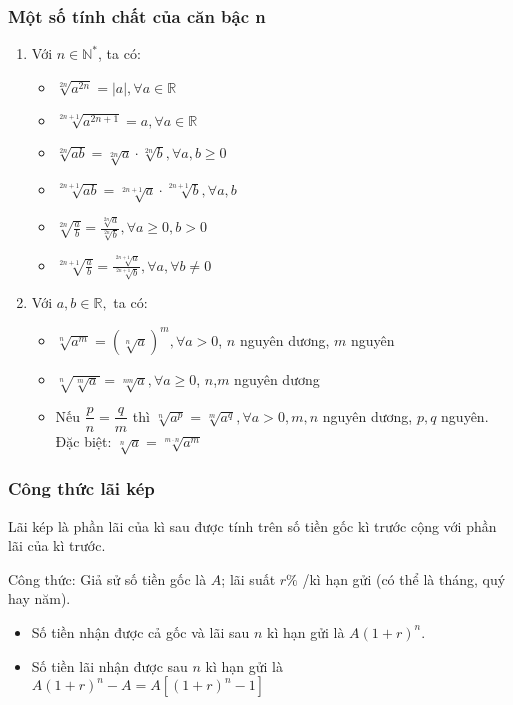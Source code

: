 \subsubsection{Một số tính chất của căn bậc n}
\begin{enumerate}
	\item Với $n\in {\mathbb{N}}^{*}$, ta có: 
	\begin{multicols}{2}
		\begin{itemize}
		\item $\sqrt[2n]{a^{2n}}=|a|,\forall a \in  \mathbb{R}$
		\item $\sqrt[2n+1]{a^{2n+1}}=a,\forall a \in \mathbb{R} $
		\item $\sqrt[2n]{ab}=\sqrt[2n]{a}\cdot \sqrt[2n]{b},\forall {a,b}\ge 0$
		\item $\sqrt[2n+1]{ab}=\sqrt[2n+1]{a}\cdot \sqrt[{2n}+1]{b},\forall a,b$ 
		\item  $\sqrt[{2n}]{\frac{a}{b}}=\frac{\sqrt[{2n}]{a}}{\sqrt[{2n}]{b}},\forall a\ge 0, b>0$
		\item $\sqrt[{2n}+1]{\frac{a}{b}}=\frac{\sqrt[{2n}+1]{a}}{\sqrt[{2n}+1]{b}},\forall a,\forall b\ne 0$
		
	\end{itemize}
	\end{multicols}

	\item Với $a,b\in \mathbb{R},$ ta có:
		\begin{itemize}
			\item $\sqrt[n]{a^m}={\left(\sqrt[n]{a}\right)}^m,\forall a>0$, $n$ nguyên dương, $m$ nguyên
		\item $\sqrt[n]{\sqrt[m]{a}}=\sqrt[nm]{a},\forall a\ge 0$, $n$,$m$ nguyên dương
		\item Nếu $\dfrac{p}{n}=\dfrac{q}{m}$ thì $\sqrt[n]{a^p}=\sqrt[m]{a^q},\forall a>0,m,n$ nguyên dương, $p,q$ nguyên. \\
		Đặc biệt: $\sqrt[n]{a}=\sqrt[m\cdot n]{a^m}$
		\end{itemize}
	\end{enumerate}
\subsubsection{Công thức lãi kép}
\begin{dn}
	Lãi kép là phần lãi của kì sau được tính trên số tiền gốc kì trước cộng với phần lãi của kì trước.
\end{dn}
Công thức: Giả sử số tiền gốc là $A$; lãi suất $r\%$ /kì hạn gửi (có thể là tháng, quý hay năm).
\begin{itemize}
	\item Số tiền nhận được cả gốc và lãi sau $n$ kì hạn gửi là $A\left(1+r\right)^n$.
	\item Số tiền lãi nhận được sau $n$ kì hạn gửi là $A\left(1+r\right)^n-A=A\left[\left(1+r\right)^n-1\right]$
\end{itemize} 
